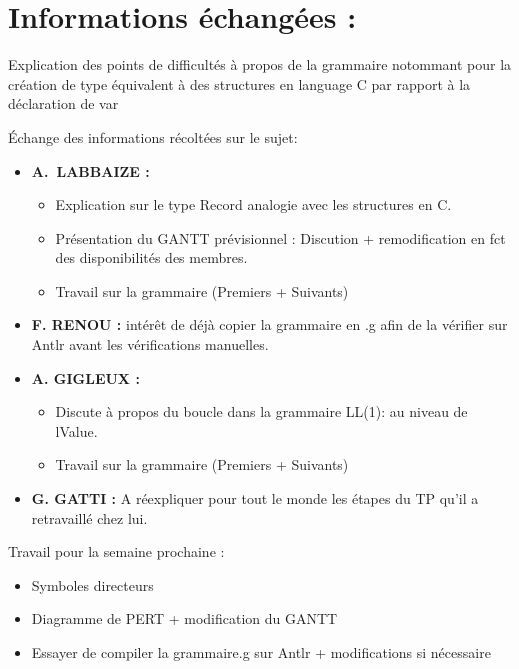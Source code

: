 \documentclass[11pt]{meetingmins}
\begin{document}
    \section{Informations échangées :}
    \begin{hiddenitems}
    
    \item Explication des points de difficultés à propos de la grammaire notommant pour la création de type équivalent à des
    structures en language C par rapport à la déclaration de var
    
    \item
    Échange des informations récoltées sur le sujet:
    \begin{itemize}
        \item \textbf{A.~LABBAIZE : } 
        \begin{itemize}
            \item Explication sur le type Record analogie avec les structures en C.
            \item Présentation du GANTT prévisionnel : Discution + remodification en fct des disponibilités des membres.
            \item Travail sur la grammaire (Premiers + Suivants)
        \end{itemize}
        
        \item \textbf{F. RENOU : }intérêt de déjà copier la grammaire en .g afin de la vérifier sur Antlr avant les vérifications manuelles.        
        
        \item \textbf{A. GIGLEUX : }
        \begin{itemize}
            \item Discute à propos du boucle dans la grammaire LL(1): au niveau de lValue. 
            \item Travail sur la grammaire (Premiers + Suivants)
        \end{itemize}
        
        \item \textbf{G. GATTI : }A réexpliquer pour tout le monde les étapes du TP qu'il a retravaillé chez lui.
        
    \end{itemize}
    
    
    \item Travail pour la semaine prochaine : 
    \begin{itemize}
        \item Symboles directeurs
        \item Diagramme de PERT + modification du GANTT
        \item Essayer de compiler la grammaire.g sur Antlr + modifications si nécessaire
    \end{itemize}
    
    
    \end{hiddenitems}
\end{document}

